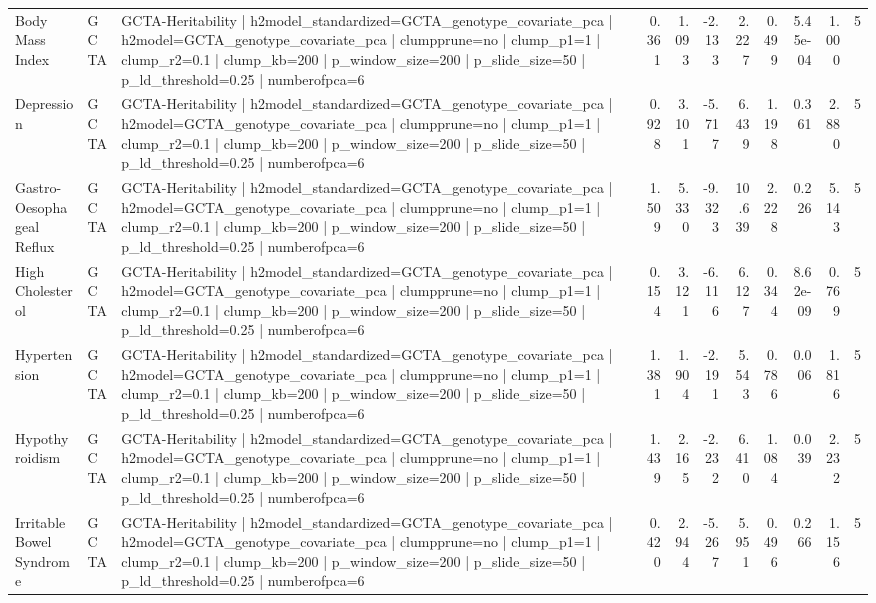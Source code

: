 \begin{landscape}
\begin{longtable}{p{2.4cm}p{1.8cm}p{6.0cm}rrrrrrrr}
Body Mass Index & GCTA & GCTA-Heritability | h2model\_standardized=GCTA\_genotype\_covariate\_pca | h2model=GCTA\_genotype\_covariate\_pca | clumpprune=no | clump\_p1=1 | clump\_r2=0.1 | clump\_kb=200 | p\_window\_size=200 | p\_slide\_size=50 | p\_ld\_threshold=0.25 | numberofpca=6 & 0.361 & 1.093 & -2.133 & 2.227 & 0.499 & 5.45e-04 & 1.000 & 5 \\
Depression & GCTA & GCTA-Heritability | h2model\_standardized=GCTA\_genotype\_covariate\_pca | h2model=GCTA\_genotype\_covariate\_pca | clumpprune=no | clump\_p1=1 | clump\_r2=0.1 | clump\_kb=200 | p\_window\_size=200 | p\_slide\_size=50 | p\_ld\_threshold=0.25 | numberofpca=6 & 0.928 & 3.101 & -5.717 & 6.439 & 1.198 & 0.361 & 2.880 & 5 \\
Gastro-Oesophageal Reflux & GCTA & GCTA-Heritability | h2model\_standardized=GCTA\_genotype\_covariate\_pca | h2model=GCTA\_genotype\_covariate\_pca | clumpprune=no | clump\_p1=1 | clump\_r2=0.1 | clump\_kb=200 | p\_window\_size=200 | p\_slide\_size=50 | p\_ld\_threshold=0.25 | numberofpca=6 & 1.509 & 5.330 & -9.323 & 10.639 & 2.228 & 0.226 & 5.143 & 5 \\
High Cholesterol & GCTA & GCTA-Heritability | h2model\_standardized=GCTA\_genotype\_covariate\_pca | h2model=GCTA\_genotype\_covariate\_pca | clumpprune=no | clump\_p1=1 | clump\_r2=0.1 | clump\_kb=200 | p\_window\_size=200 | p\_slide\_size=50 | p\_ld\_threshold=0.25 | numberofpca=6 & 0.154 & 3.121 & -6.116 & 6.127 & 0.344 & 8.62e-09 & 0.769 & 5 \\
Hypertension & GCTA & GCTA-Heritability | h2model\_standardized=GCTA\_genotype\_covariate\_pca | h2model=GCTA\_genotype\_covariate\_pca | clumpprune=no | clump\_p1=1 | clump\_r2=0.1 | clump\_kb=200 | p\_window\_size=200 | p\_slide\_size=50 | p\_ld\_threshold=0.25 | numberofpca=6 & 1.381 & 1.904 & -2.191 & 5.543 & 0.786 & 0.006 & 1.816 & 5 \\
Hypothyroidism & GCTA & GCTA-Heritability | h2model\_standardized=GCTA\_genotype\_covariate\_pca | h2model=GCTA\_genotype\_covariate\_pca | clumpprune=no | clump\_p1=1 | clump\_r2=0.1 | clump\_kb=200 | p\_window\_size=200 | p\_slide\_size=50 | p\_ld\_threshold=0.25 | numberofpca=6 & 1.439 & 2.165 & -2.232 & 6.410 & 1.084 & 0.039 & 2.232 & 5 \\
Irritable Bowel Syndrome & GCTA & GCTA-Heritability | h2model\_standardized=GCTA\_genotype\_covariate\_pca | h2model=GCTA\_genotype\_covariate\_pca | clumpprune=no | clump\_p1=1 | clump\_r2=0.1 | clump\_kb=200 | p\_window\_size=200 | p\_slide\_size=50 | p\_ld\_threshold=0.25 | numberofpca=6 & 0.420 & 2.944 & -5.267 & 5.951 & 0.496 & 0.266 & 1.156 & 5 \\

\end{longtable}
\end{landscape}
